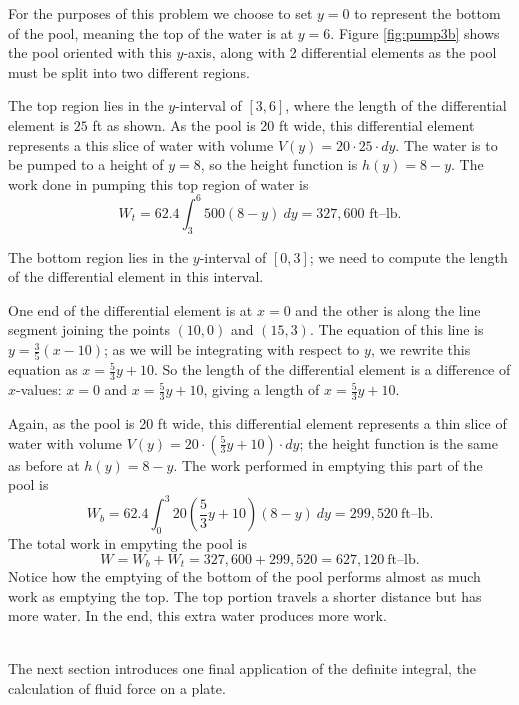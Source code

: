 {For the purposes of this problem we choose to set $y=0$ to represent the bottom of the pool, meaning the top of the water is at $y=6$. 
Figure \ref{fig:pump3b} shows the pool oriented with this $y$-axis, along with 2 differential elements as the pool must be split into two different regions. 

The top region lies in the $y$-interval of $[3,6]$, where the length of the differential element is $25$ ft as shown. As the pool is 20 ft wide, this differential element represents a this slice of water with volume $V(y) = 20\cdot25\cdot dy$.  The water is to be pumped to a height of $y=8$, so the height function is $h(y) = 8-y$. The work done in pumping this top region of water is 
$$W_t = 62.4\int_3^6 500(8-y)\ dy = 327,600 \text{ ft--lb}.$$

The bottom region lies in the $y$-interval of $[0,3]$; we need to compute the length of the differential element in this interval.

One end of the differential element is at $x=0$ and the other is along the line segment joining the points $(10,0)$ and $(15,3)$. The equation of this line is $y= \frac{3}{5}(x-10)$; as we will be integrating with respect to $y$, we rewrite this equation as $x=\frac{5}{3}y+10$. So the length of the differential element is a difference of $x$-values: $x=0$ and $x=\frac{5}{3}y+10$, giving a length of $x=\frac{5}{3}y+10$. 

Again, as the pool is 20 ft wide, this differential element represents a thin slice of water with volume $V(y) = 20\cdot\left(\frac{5}{3}y+10\right)\cdot dy$; the height function is the same as before at $h(y)=8-y$. The work performed in emptying this part of the pool is
$$W_b = 62.4\int_0^3 20\left(\frac{5}{3}y+10\right)(8-y)\ dy = 299,520\ \text{ft--lb}.$$
The total work in empyting the pool is 
$$W = W_b+W_t = 327,600+299,520 = 627,120\ \text{ft--lb}.$$		
Notice how the emptying of the bottom of the pool performs almost as much work as emptying the top. The top portion travels a shorter distance but has more water. In the end, this extra water produces more work.
}\\

The next section introduces one final application of the definite integral, the calculation of fluid force on a plate.

